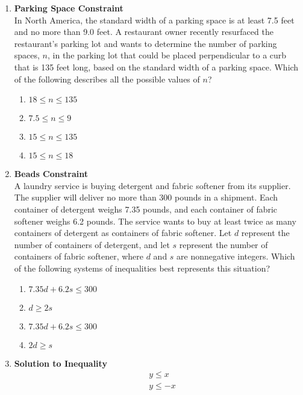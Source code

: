 \begin{enumerate}
\item \textbf{Parking Space Constraint}\\
In North America, the standard width of a parking space is at least 7.5 feet and no more than 9.0 feet. A restaurant owner recently resurfaced the restaurant's parking lot and wants to determine the number of parking spaces, $n$, in the parking lot that could be placed perpendicular to a curb that is 135 feet long, based on the standard width of a parking space. Which of the following describes all the possible values of $n$?
\begin{enumerate}[label=(\Alph*)]
  \item $18 \leq n \leq 135$
  \item $7.5 \leq n \leq 9$
  \item $15 \leq n \leq 135$
  \item $15 \leq n \leq 18$
\end{enumerate}
\begin{subanswer}
\end{subanswer}

\item \textbf{Beads Constraint}\\
A laundry service is buying detergent and fabric softener from its supplier. The supplier will deliver no more than 300 pounds in a shipment. Each container of detergent weighs 7.35 pounds, and each container of fabric softener weighs 6.2 pounds. The service wants to buy at least twice as many containers of detergent as containers of fabric softener. Let $d$ represent the number of containers of detergent, and let $s$ represent the number of containers of fabric softener, where $d$ and $s$ are nonnegative integers. Which of the following systems of inequalities best represents this situation?
\begin{enumerate}[label=(\Alph*)]
  \item $7.35d + 6.2s \leq 300$
  \item $d \geq 2s$
  \item $7.35d + 6.2s \leq 300$
  \item $2d \geq s$
\end{enumerate}
\begin{subanswer}
\end{subanswer}

\item \textbf{Solution to Inequality}\\
$$
\begin{aligned}
& y \leq x \\
& y \leq -x
\end{aligned}
$$


\end{enumerate}
